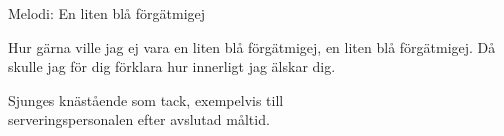 \begin{song}

\begin{songmeta}
Melodi: En liten blå förgätmigej
\end{songmeta}

\begin{songtext}
Hur gärna ville jag ej vara
en liten blå förgätmigej,
en liten blå förgätmigej.
Då skulle jag för dig förklara
hur innerligt jag älskar dig.
\end{songtext}

\begin{songnotes}
Sjunges knästående som tack, exempelvis till \\
serveringspersonalen efter avslutad måltid.
\end{songnotes}
\end{song}
